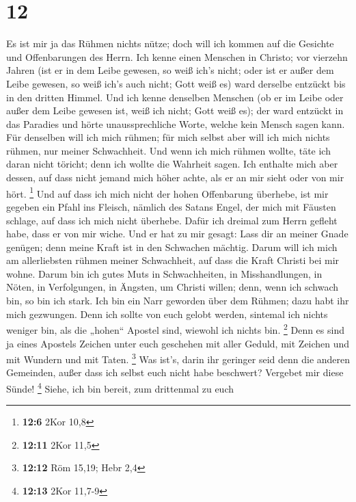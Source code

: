 \hypertarget{section-11}{%
\section{12}\label{section-11}}

 Es ist mir ja das Rühmen nichts nütze; doch will ich
kommen auf die Gesichte und Offenbarungen des Herrn.  Ich
kenne einen Menschen in Christo; vor vierzehn Jahren (ist er in dem
Leibe gewesen, so weiß ich's nicht; oder ist er außer dem Leibe gewesen,
so weiß ich's auch nicht; Gott weiß es) ward derselbe entzückt bis in
den dritten Himmel.  Und ich kenne denselben Menschen (ob
er im Leibe oder außer dem Leibe gewesen ist, weiß ich nicht; Gott weiß
es);  der ward entzückt in das Paradies und hörte
unaussprechliche Worte, welche kein Mensch sagen kann. 
Für denselben will ich mich rühmen; für mich selbst aber will ich mich
nichts rühmen, nur meiner Schwachheit.  Und wenn ich mich
rühmen wollte, täte ich daran nicht töricht; denn ich wollte die
Wahrheit sagen. Ich enthalte mich aber dessen, auf dass nicht jemand
mich höher achte, als er an mir sieht oder von mir hört. \footnote{\textbf{12:6}
  2Kor 10,8}  Und auf dass ich mich nicht der hohen
Offenbarung überhebe, ist mir gegeben ein Pfahl ins Fleisch, nämlich des
Satans Engel, der mich mit Fäusten schlage, auf dass ich mich nicht
überhebe.  Dafür ich dreimal zum Herrn gefleht habe, dass
er von mir wiche.  Und er hat zu mir gesagt: Lass dir an
meiner Gnade genügen; denn meine Kraft ist in den Schwachen mächtig.
Darum will ich mich am allerliebsten rühmen meiner Schwachheit, auf dass
die Kraft Christi bei mir wohne.  Darum bin ich gutes
Muts in Schwachheiten, in Misshandlungen, in Nöten, in Verfolgungen, in
Ängsten, um Christi willen; denn, wenn ich schwach bin, so bin ich
stark.  Ich bin ein Narr geworden über dem Rühmen; dazu
habt ihr mich gezwungen. Denn ich sollte von euch gelobt werden,
sintemal ich nichts weniger bin, als die „hohen`` Apostel sind, wiewohl
ich nichts bin. \footnote{\textbf{12:11} 2Kor 11,5}  Denn
es sind ja eines Apostels Zeichen unter euch geschehen mit aller Geduld,
mit Zeichen und mit Wundern und mit Taten. \footnote{\textbf{12:12} Röm
  15,19; Hebr 2,4}  Was ist's, darin ihr geringer seid
denn die anderen Gemeinden, außer dass ich selbst euch nicht habe
beschwert? Vergebet mir diese Sünde! \footnote{\textbf{12:13} 2Kor
  11,7-9}  Siehe, ich bin bereit, zum drittenmal zu euch
